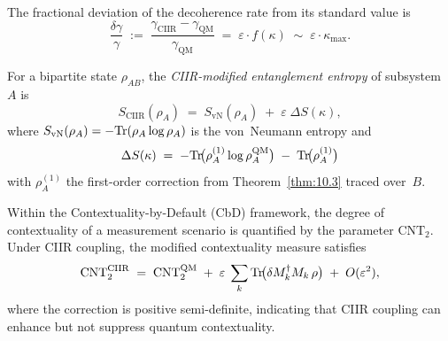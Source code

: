 \begin{proposition}
\label{prop:10.2}
The fractional deviation of the decoherence rate from its standard
value is
\begin{equation}
\label{eq:10.decoherence_anomaly}
  \frac{\delta\gamma}{\gamma}
  \;:=\;
  \frac{\gamma_{\mathrm{CIIR}} - \gamma_{\mathrm{QM}}}
       {\gamma_{\mathrm{QM}}}
  \;=\;
  \varepsilon\cdot f(\kappa)
  \;\sim\;
  \varepsilon\cdot\kappa_{\max}.
\end{equation}
\end{proposition}

\begin{definition}
\label{def:10.14}
For a bipartite state $\rho_{AB}$, the \emph{CIIR-modified
entanglement entropy} of subsystem~$A$ is
\begin{equation}
\label{eq:10.entropy}
  S_{\mathrm{CIIR}}(\rho_A)
  \;=\;
  S_{\mathrm{vN}}(\rho_A)
  \;+\;
  \varepsilon\;\Delta S(\kappa),
\end{equation}
where $S_{\mathrm{vN}}(\rho_A)=-\mathrm{Tr}(\rho_A\log\rho_A)$ is the
von~Neumann entropy and
\[
  \Delta S(\kappa)
  \;=\;
  -\mathrm{Tr}\!\bigl(\rho^{(1)}_A\log\rho_A^{\mathrm{QM}}\bigr)
  \;-\;
  \mathrm{Tr}\!\bigl(\rho^{(1)}_A\bigr)
\]
with $\rho_A^{(1)}$ the first-order correction from
Theorem~\ref{thm:10.3} traced over~$B$.
\end{definition}

\begin{proposition}
\label{prop:10.3}
Within the Contextuality-by-Default (CbD) framework, the degree of
contextuality of a measurement scenario is quantified by the
parameter $\mathrm{CNT}_2$.  Under CIIR coupling, the modified
contextuality measure satisfies
\[
  \mathrm{CNT}_2^{\mathrm{CIIR}}
  \;=\;
  \mathrm{CNT}_2^{\mathrm{QM}}
  \;+\;
  \varepsilon\;\sum_k
  \mathrm{Tr}\!\bigl(\delta M_k^{\dagger}M_k\,\rho\bigr)
  \;+\;
  O(\varepsilon^2),
\]
where the correction is positive semi-definite, indicating that CIIR
coupling can enhance but not suppress quantum contextuality.
\end{proposition}

